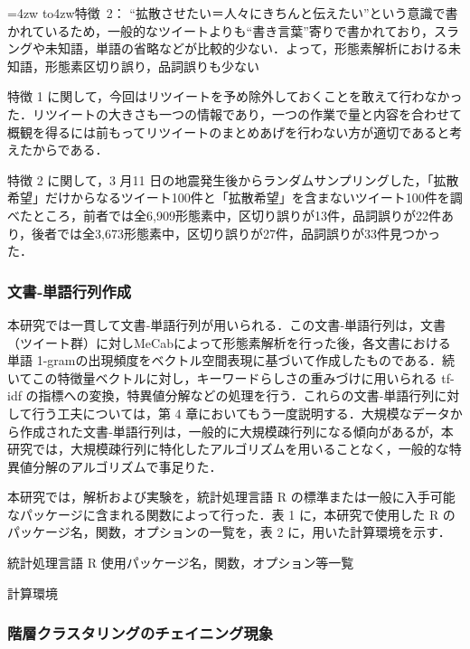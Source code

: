 \documentclass[japanese]{jnlp_1.4}
\begin{document}
\hangindent=4zw\noindent
\hbox to4zw{特徴~2：\hss}
``拡散させたい＝人々にきちんと伝えたい''という意識で書かれているため，一般的なツイートよりも``書き言葉''寄りで書かれており，スラングや未知語，単語の省略などが比較的少ない．よって，形態素解析における未知語，形態素区切り誤り，品詞誤りも少ない


特徴 1 に関して，今回はリツイートを予め除外しておくことを敢えて行わなかった．リツイートの大きさも一つの情報であり，一つの作業で量と内容を合わせて概観を得るには前もってリツイートのまとめあげを行わない方が適切であると考えたからである．

特徴 2 に関して，3 月11 日の地震発生後からランダムサンプリングした，「拡散希望」だけからなるツイート100件と「拡散希望」を含まないツイート100件を調べたところ，前者では全6,909形態素中，区切り誤りが13件，品詞誤りが22件あり，後者では全3,673形態素中，区切り誤りが27件，品詞誤りが33件見つかった．


\subsubsection{文書‐単語行列作成}

本研究では一貫して文書‐単語行列が用いられる．この文書‐単語行列は，文書（ツイート群）に対しMeCabによって形態素解析を行った後，各文書における単語 1-gramの出現頻度をベクトル空間表現に基づいて作成したものである．続いてこの特徴量ベクトルに対し，キーワードらしさの重みづけに用いられる tf-idf の指標への変換，特異値分解などの処理を行う．これらの文書‐単語行列に対して行う工夫については，第 4 章においてもう一度説明する．大規模なデータから作成された文書‐単語行列は，一般的に大規模疎行列になる傾向があるが，本研究では，大規模疎行列に特化したアルゴリズムを用いることなく，一般的な特異値分解のアルゴリズムで事足りた．

本研究では，解析および実験を，統計処理言語 R の標準または一般に入手可能なパッケージに含まれる関数によって行った．表 1 に，本研究で使用した R のパッケージ名，関数，オプションの一覧を，表 2 に，用いた計算環境を示す．

\begin{table}[b]
\caption{統計処理言語 R 使用パッケージ名，関数，オプション等一覧}

\end{table}
\begin{table}[b]
\caption{計算環境}

\end{table}



\subsubsection{階層クラスタリングのチェイニング現象}
\end{document}
